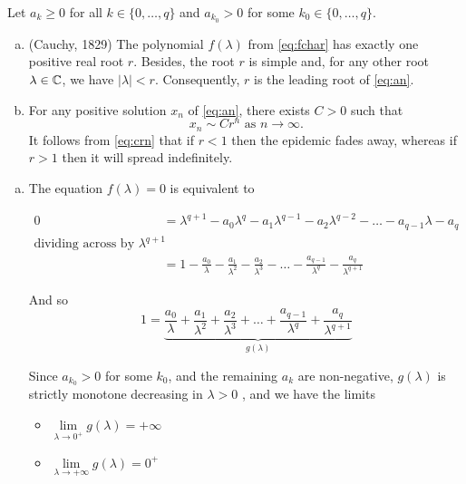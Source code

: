 \begin{theorem}\label{thm:lim}
Let $a_k \geq 0$ for all $k \in \{0,\dots,q\}$ and $a_{k_0} > 0$ for some $k_0\in \{0,\dots,q\}$.
\begin{enumerate}[(a)]
    \item (Cauchy, 1829) The polynomial $f(\lambda)$ from \eqref{eq:fchar} has exactly one positive real root $r$. Besides, the root $r$ is simple and, for any other root $\lambda \in \mathbb C$, we have $|\lambda| < r$. Consequently, $r$ is the leading root of \eqref{eq:an}.
    \item For any positive solution $x_n$ of \eqref{eq:an}, there exists $C > 0$ such that
    \begin{equation}\label{eq:crn}
        x_n \sim Cr^n \text{ as } n\to\infty.
    \end{equation}
    It follows from \eqref{eq:crn} that if $r < 1$ then the epidemic fades away, whereas if $r > 1$ then it will spread indefinitely.
\end{enumerate}
\begin{pf}
\begin{enumerate}[(a)]
\item The equation $f(\lambda) = 0$ is equivalent to

$\begin{aligned}
0 &= \lambda^{q+1} - a_0\lambda^q - a_1\lambda^{q-1} - a_2\lambda^{q-2} - \dots - a_{q-1}\lambda - a_q \\
\text{dividing across by } \lambda^{q+1} \\
  &= 1 - \frac{a_0}{\lambda} - \frac{a_1}{\lambda^2} - \frac{a_2}{\lambda^3}-\dots - \frac{a_{q-1}}{\lambda^q} -\frac{a_q}{\lambda^{q+1}}
\end{aligned}$
    
And so
\begin{equation} \label{eq:glambda}
1 =\underbrace{\frac{a_0}{\lambda} + \frac{a_1}{\lambda^2} + \frac{a_2}{\lambda^3}+\dots + \frac{a_{q-1}}{\lambda^q} +\frac{a_q}{\lambda^{q+1}}}_{g(\lambda)}    
\end{equation}

Since $a_{k_0} > 0$ for some $k_0$, and the remaining $a_k$ are non-negative, $g(\lambda)$ is strictly monotone decreasing in $\lambda > 0$ 
,  and we have the limits

\begin{itemize}
    \item $\lim\limits_{\lambda\to0^+}g(\lambda)=+\infty$
    \item $\lim\limits_{\lambda\to+\infty}g(\lambda)=0^+$
\end{itemize}


\end{enumerate}
\end{pf}
\end{theorem}
